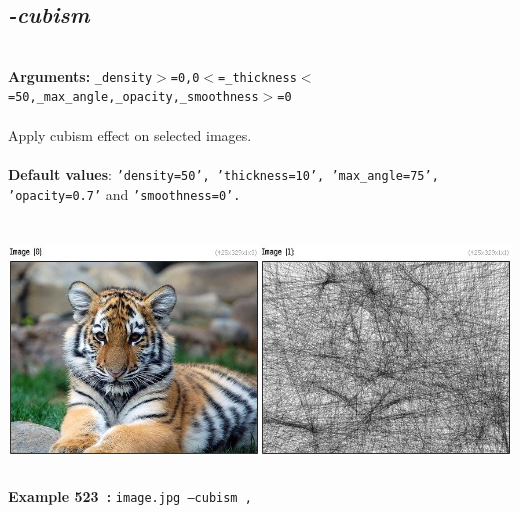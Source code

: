 \documentclass[a4paper,11pt,twoside]{book}
\begin{document}
\subsection{\emph{-cubism} }\vspace*{-0.5em}
~\\\textbf{Arguments: } 
{\small \texttt{\_density$>$=0,0$<$=\_thickness$<$=50,\_max\_angle,\_opacity,\_smoothness$>$=0}}\\~\\
Apply cubism effect on selected images.
~\\~\\\textbf{Default values}: {\small \texttt{'density=50', 'thickness=10', 'max\_angle=75', 'opacity=0.7'} and \texttt{'smoothness=0'.}}
\begin{center}\includegraphics[keepaspectratio=true,height=7cm,width=\textwidth]{img/gmic_def523.jpg}\\
{\footnotesize \textbf{Example 523~:} \texttt{image.jpg --cubism ,}}
\end{center}
\end{document}
